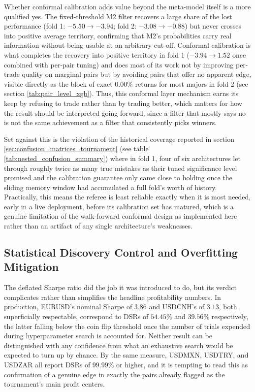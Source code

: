 \documentclass[12pt, a4paper]{article}
\begin{document}
Whether conformal calibration adds value beyond the meta-model itself is a more qualified yes. The fixed-threshold M2 filter recovers a large share of the lost performance 
(fold 1: $-5.50 \to -3.94$; fold 2: $-3.08 \to -0.88$) but never crosses into positive average territory, confirming that M2's probabilities carry real information without being 
usable at an arbitrary cut-off. Conformal calibration is what completes the recovery into positive territory in fold 1 ($-3.94 \to 1.52$ once combined with per-pair tuning) and 
does most of its work not by improving per-trade quality on marginal pairs but by avoiding pairs that offer no apparent edge, visible directly as the block of exact 
$0.00\%$ returns for most majors in fold 2 (see section \ref{tab:pair_level_xgb}). Thus, this conformal layer mechanism earns its keep by refusing to trade rather than by trading 
better, which matters for how the result should be interpreted going forward, since a filter that mostly says no is not the same achievement as a filter that consistently picks winners.

\medskip

Set against this is the violation of the historical coverage reported in section \ref{sec:confusion_matrices_tournament} (see table \ref{tab:nested_confusion_summary}) where in fold 1, 
four of six architectures let through roughly twice as many true mistakes as their tuned significance level promised and the calibration guarantee only came close to holding once the 
sliding memory window had accumulated a full fold's worth of history. Practically, this means the referee is least reliable exactly when it is most needed, early in a live deployment, 
before its calibration set has matured, which is a genuine limitation of the walk-forward conformal design as implemented here rather than an artifact of any single architecture's 
weaknesses.


\subsection{Statistical Discovery Control and Overfitting Mitigation}

The deflated Sharpe ratio did the job it was introduced to do, but its verdict complicates rather than simplifies the headline profitability numbers. In production, EURUSD's 
nominal Sharpe of $3.86$ and USDCNH's of $3.13$, both superficially respectable, correspond to DSRs of $54.45\%$ and $39.56\%$ respectively, the latter falling below the 
coin flip threshold once the number of trials expended during hyperparameter search is accounted for. Neither result can be distinguished with any confidence from what an 
exhaustive search would be expected to turn up by chance. By the same measure, USDMXN, USDTRY, and USDZAR all report DSRs of $99.99\%$ or higher, and it is tempting to read this 
as confirmation of a genuine edge in exactly the pairs already flagged as the tournament's main profit centers.
\end{document}
